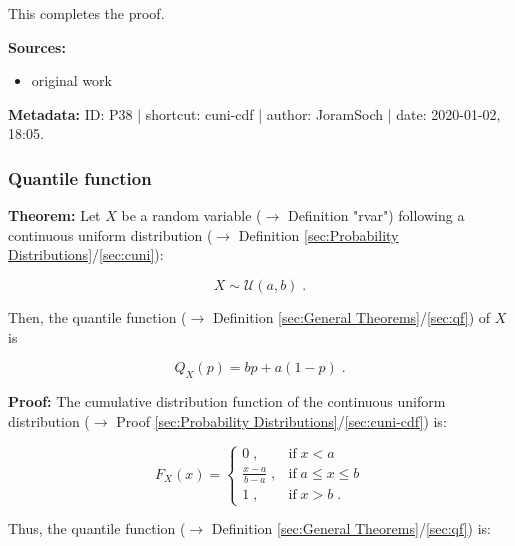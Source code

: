 \documentclass[a4paper,12pt]{book}
\begin{document}
This completes the proof.

\vspace{1em}
\textbf{Sources:}
\begin{itemize}
\item original work\end{itemize}


\vspace{1em}
\textbf{Metadata:} ID: P38 | shortcut: cuni-cdf | author: JoramSoch | date: 2020-01-02, 18:05.


\subsubsection[\textbf{Quantile function}]{Quantile function} \label{sec:cuni-qf}

\vspace{1em}
\textbf{Theorem:} Let $X$ be a random variable ($\rightarrow$ Definition "rvar") following a continuous uniform distribution ($\rightarrow$ Definition \ref{sec:Probability Distributions}/\ref{sec:cuni}):

\begin{equation} \label{eq:cuni-qf-cuni}
X \sim \mathcal{U}(a, b) \; .
\end{equation}

Then, the quantile function ($\rightarrow$ Definition \ref{sec:General Theorems}/\ref{sec:qf}) of $X$ is

\begin{equation} \label{eq:cuni-qf-cuni-qf}
Q_X(p) = bp + a(1-p) \; .
\end{equation}


\vspace{1em}
\textbf{Proof:} The cumulative distribution function of the continuous uniform distribution ($\rightarrow$ Proof \ref{sec:Probability Distributions}/\ref{sec:cuni-cdf}) is:

\begin{equation} \label{eq:cuni-qf-cuni-cdf}
F_X(x) = \left\{
\begin{array}{rl}
0 \; , & \text{if} \; x < a \\
\frac{x-a}{b-a} \; , & \text{if} \; a \leq x \leq b \\
1 \; , & \text{if} \; x > b \; .
\end{array}
\right.
\end{equation}

Thus, the quantile function ($\rightarrow$ Definition \ref{sec:General Theorems}/\ref{sec:qf}) is:
\end{document}
